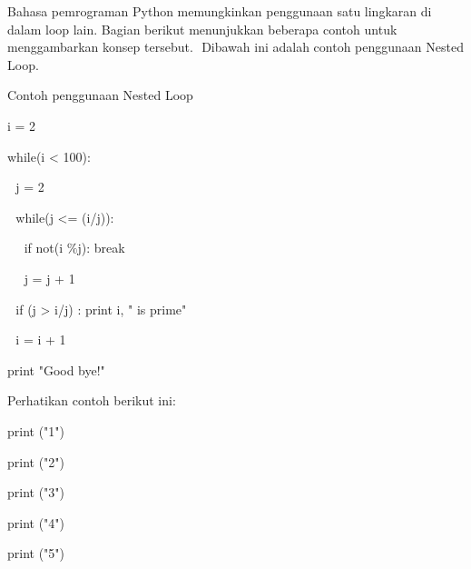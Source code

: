 \vspace{12pt}
\noindent 
Bahasa pemrograman Python memungkinkan penggunaan satu lingkaran di dalam loop lain. Bagian berikut menunjukkan beberapa contoh untuk menggambarkan konsep tersebut. $  $\vspace{\baselineskip}
\vspace{\baselineskip}
Dibawah ini adalah contoh penggunaan Nested Loop. \par
\noindent 
Contoh penggunaan Nested Loop \par
\noindent 
\vspace{\baselineskip}
\vspace{\baselineskip}
i = 2 \par
\noindent 
\vspace{\baselineskip}
while(i < 100): \par
\noindent 
\vspace{\baselineskip}
 $  $  $  $ j = 2 \par
\noindent 
\vspace{\baselineskip}
 $  $  $  $ while(j <= (i/j)): \par
\noindent 
\vspace{\baselineskip}
 $  $  $  $  $  $  $  $ if not(i $  \%  $j): break \par
\noindent 
\vspace{\baselineskip}
 $  $  $  $  $  $  $  $ j = j + 1 \par
\noindent 
\vspace{\baselineskip}
 $  $  $  $ if (j > i/j) : print i, " is prime" \par
\noindent 
\vspace{\baselineskip}
 $  $  $  $ i = i + 1 \par
\noindent 
\vspace{\baselineskip}
\vspace{\baselineskip}
print "Good bye!" \par
\vspace{12pt}
\vspace{12pt}
Perhatikan contoh berikut ini:\vspace{\baselineskip}
\vspace{\baselineskip}
 \par
\vspace{12pt}
print ("1") \par
print ("2") \par
print ("3") \par
print ("4") \par
print ("5") \par
